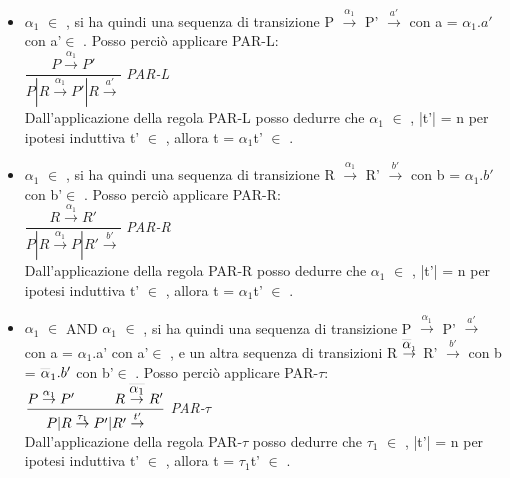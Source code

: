 \begin{itemize}
	\item $\alpha_{1}$ $\in$ , si ha quindi una sequenza di transizione P $\overset{\alpha_{1}}\rightarrow$ P' $\overset{a'}\rightarrow$ con a = $\alpha_{1}.a'$ con a'$\in$ . Posso perciò applicare PAR-L:\\
	
	$\dfrac{P \overset{\alpha_{1}}\rightarrow P'}{P|R \overset{\alpha_{1}}\rightarrow P'|R\overset{a'}\rightarrow}$ \textit{PAR-L} \\
	
	Dall'applicazione della regola PAR-L posso dedurre che $\alpha_{1}$ $\in$ , |t'| = n  per ipotesi induttiva t' $\in$ , allora t = $\alpha_{1}$t' $\in$ .  \\
	
	\item $\alpha_{1}$ $\in$ , si ha quindi una sequenza di transizione R $\overset{\alpha_{1}}\rightarrow$ R' $\overset{b'}\rightarrow$ con b = $\alpha_{1}.b'$ con b'$\in$ . Posso perciò applicare PAR-R:\\
	
	$\dfrac{R \overset{\alpha_{1}}\rightarrow R'}{P|R \overset{\alpha_{1}}\rightarrow P|R'\overset{b'}\rightarrow}$ \textit{PAR-R} \\
	
	Dall'applicazione della regola PAR-R posso dedurre che $\alpha_{1}$ $\in$ , |t'| = n per ipotesi induttiva t' $\in$ , allora t = $\alpha_{1}$t' $\in$ .\\
	
	\item $\alpha_{1}$ $\in$  AND $\alpha_{1}$ $\in$ , si ha quindi una sequenza di transizione P $\overset{\alpha_{1}}\rightarrow$ P' $\overset{a'}\rightarrow$ con a = $\alpha_{1}$.a' con a'$\in$ , e un altra sequenza di transizioni R $\overset{\Overline[0.1pt]\alpha_{1}}\rightarrow$ R' $\overset{b'}\rightarrow$ con b = $ \Overline[0.1pt]\alpha_{1}.b'$ con b'$\in$ . Posso perciò applicare PAR-$\tau$:\\
	
	$\dfrac{P \overset{\alpha_{1}}\rightarrow P' \hspace{1cm} R \overset{\Overline[0.1pt]{\alpha_{1}}}\rightarrow R'}{P|R \overset{\tau_{1}}\rightarrow P'|R'\overset{t'}\rightarrow}$ \textit{PAR-$\tau$}\\
	
	Dall'applicazione della regola PAR-$\tau$ posso dedurre che $\tau_{1}$ $\in$ , |t'| = n per ipotesi induttiva t' $\in$ , allora t = $\tau_{1}$t' $\in$ .\\

	
\end{itemize}

